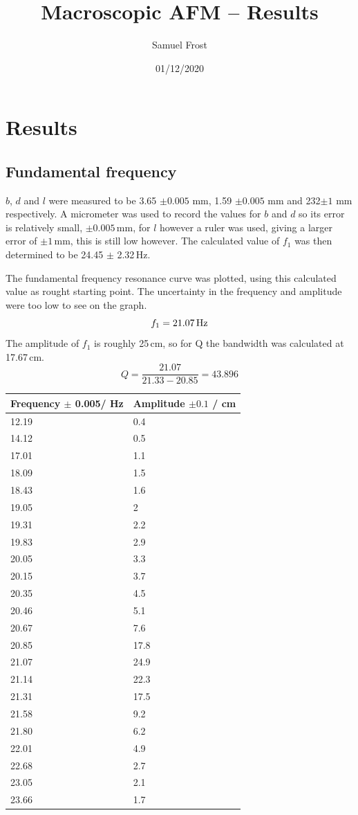 \documentclass{article}
\title{Macroscopic AFM -- Results}
\date{01/12/2020}
\author{Samuel Frost}
\begin{document}
\maketitle

\section*{Results}
\subsection*{Fundamental frequency}
$b$, $d$ and $l$ were measured to be 3.65 $\pm 0.005$ mm, 1.59 $\pm 0.005$ mm and 232$\pm 1$ mm respectively. 
A micrometer was used to record the values for $b$ and $d$ so 
its error is relatively small, $\pm 0.005$\,mm, for $l$ however a ruler was used, giving a larger error of 
$\pm 1$\,mm, this is still low however.
The calculated value of $f_1$ was then determined to be 24.45 $\pm$ 2.32\,Hz.

The fundamental frequency resonance curve was plotted, using this calculated value as rought starting point.
The uncertainty in the frequency and amplitude were too low to see on the graph.
$$f_1 = 21.07\text{\,Hz}$$
The amplitude of $f_1$ is roughly 25\,cm, so for Q the bandwidth was calculated at 17.67\,cm.
$$Q = \frac{21.07}{21.33-20.85} = 43.896$$

\begin{tabular}{l | l}
    Frequency $\pm$ 0.005/ Hz & Amplitude $\pm 0.1$ / cm\\
    \hline
    12.19 & 0.4\\
    14.12 & 0.5\\
    17.01 & 1.1\\
    18.09&1.5\\
    18.43&1.6\\
    19.05&2\\
    19.31&2.2\\
    19.83&2.9\\
    20.05&3.3\\
    20.15&3.7\\
    20.35&4.5\\
    20.46&5.1\\
    20.67&7.6\\
    20.85&17.8\\
    21.07&24.9\\
    21.14&22.3\\
    21.31&17.5\\
    21.58&9.2\\
    21.80&6.2\\
    22.01&4.9\\
    22.68&2.7\\
    23.05&2.1\\
    23.66&1.7\\
\end{tabular}
\end{document}
